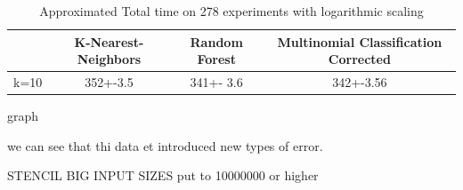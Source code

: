 \documentclass[12pt]{article}
\begin{document}
\begin{table}[h]
	\centering
	\caption{Approximated Total time on 278 experiments with logarithmic scaling}
	\label{my-label}
	\begin{tabular}{|c|c|c|c|}
		\hline
		& K-Nearest-Neighbors & Random Forest &Multinomial Classification Corrected\\ \hline
		k=10  & 352+-3.5        & 341+- 3.6&342+-3.56 \\ \hline
	\end{tabular}
\end{table}
graph

we can see that thi data et introduced new types of error. 

STENCIL BIG INPUT SIZES 
put to 10000000 or higher
\end{document}
